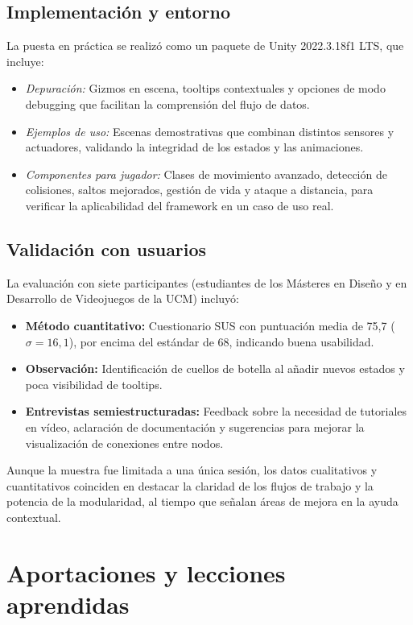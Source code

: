 \subsection{Implementación y entorno}
La puesta en práctica se realizó como un paquete de Unity 2022.3.18f1 LTS, que incluye:
\begin{itemize}
  \item \emph{Depuración:} Gizmos en escena, tooltips contextuales y opciones de modo debugging que facilitan la comprensión del flujo de datos.
  \item \emph{Ejemplos de uso:} Escenas demostrativas que combinan distintos sensores y actuadores, validando la integridad de los estados y las animaciones.
  \item \emph{Componentes para jugador:} Clases de movimiento avanzado, detección de colisiones, saltos mejorados, gestión de vida y ataque a distancia, para verificar la aplicabilidad del framework en un caso de uso real.
\end{itemize}

\subsection{Validación con usuarios}
La evaluación con siete participantes (estudiantes de los Másteres en Diseño y en Desarrollo de Videojuegos de la UCM) incluyó:
\begin{itemize}
  \item \textbf{Método cuantitativo:} Cuestionario SUS con puntuación media de 75,7 (\(\sigma=16,1\)), por encima del estándar de 68, indicando buena usabilidad.  
  \item \textbf{Observación:} Identificación de cuellos de botella al añadir nuevos estados y poca visibilidad de tooltips.  
  \item \textbf{Entrevistas semiestructuradas:} Feedback sobre la necesidad de tutoriales en vídeo, aclaración de documentación y sugerencias para mejorar la visualización de conexiones entre nodos.  
\end{itemize}
Aunque la muestra fue limitada a una única sesión, los datos cualitativos y cuantitativos coinciden en destacar la claridad de los flujos de trabajo y la potencia de la modularidad, al tiempo que señalan áreas de mejora en la ayuda contextual.

\section{Aportaciones y lecciones aprendidas}

